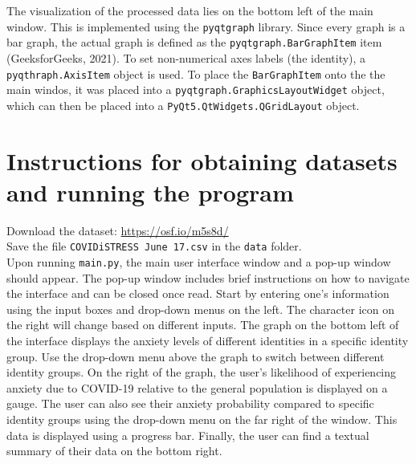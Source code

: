 \documentclass[fontsize=11pt]{article}
\begin{document}
    The visualization of the processed data lies on the bottom left of the main window. This is implemented using the \texttt{pyqtgraph} library. Since every graph is a bar graph, the actual graph is defined as the \texttt{pyqtgraph.BarGraphItem} item (GeeksforGeeks, 2021). To set non-numerical axes labels (the identity), a \texttt{pyqthraph.AxisItem} object is used. To place the \texttt{BarGraphItem} onto the the main windos, it was placed into a \texttt{pyqtgraph.GraphicsLayoutWidget} object, which can then be placed into a \texttt{PyQt5.QtWidgets.QGridLayout} object.

    \section*{Instructions for obtaining datasets and running the program}
    Download the dataset: \url{https://osf.io/m5s8d/} \\
    Save the file \texttt{COVIDiSTRESS June 17.csv} in the \texttt{data} folder. \\

    Upon running \texttt{main.py}, the main user interface window and a pop-up window should appear. The pop-up window includes brief instructions on how to navigate the interface and can be closed once read. Start by entering one’s information using the input boxes and drop-down menus on the left. The character icon on the right will change based on different inputs. The graph on the bottom left of the interface displays the anxiety levels of different identities in a specific identity group. Use the drop-down menu above the graph to switch between different identity groups. On the right of the graph, the user’s likelihood of experiencing anxiety due to COVID-19 relative to the general population is displayed on a gauge. The user can also see their anxiety probability compared to specific identity groups using the drop-down menu on the far right of the window. This data is displayed using a progress bar. Finally, the user can find a textual summary of their data on the bottom right.
\end{document}
